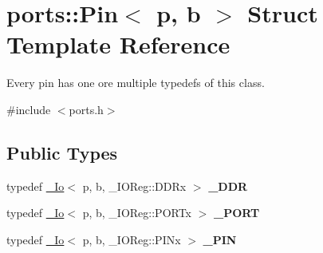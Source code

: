\hypertarget{structports_1_1Pin}{}\section{ports\+:\+:Pin$<$ p, b $>$ Struct Template Reference}
\label{structports_1_1Pin}


Every pin has one ore multiple typedefs of this class.  




{\ttfamily \#include $<$ports.\+h$>$}

\subsection*{Public Types}
\begin{DoxyCompactItemize}
\item 
typedef \hyperlink{structports_1_1__Io}{\+\_\+\+Io}$<$ p, b, \+\_\+\+I\+O\+Reg\+::\+D\+D\+Rx $>$ {\bfseries \+\_\+\+D\+DR}\hypertarget{structports_1_1Pin_a520a470d63ee662a6e32050e23118405}{}\label{structports_1_1Pin_a520a470d63ee662a6e32050e23118405}

\item 
typedef \hyperlink{structports_1_1__Io}{\+\_\+\+Io}$<$ p, b, \+\_\+\+I\+O\+Reg\+::\+P\+O\+R\+Tx $>$ {\bfseries \+\_\+\+P\+O\+RT}\hypertarget{structports_1_1Pin_a21300f49ada5e9c43c8c7fd3c5d02bab}{}\label{structports_1_1Pin_a21300f49ada5e9c43c8c7fd3c5d02bab}

\item 
typedef \hyperlink{structports_1_1__Io}{\+\_\+\+Io}$<$ p, b, \+\_\+\+I\+O\+Reg\+::\+P\+I\+Nx $>$ {\bfseries \+\_\+\+P\+IN}\hypertarget{structports_1_1Pin_a11990dc8597439185ba300ee0bbc54e6}{}\label{structports_1_1Pin_a11990dc8597439185ba300ee0bbc54e6}

\end{DoxyCompactItemize}
